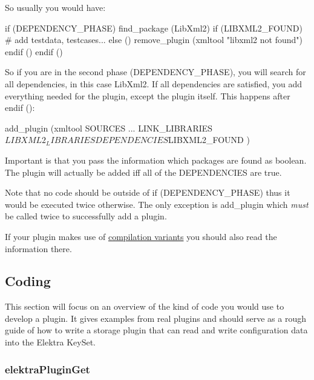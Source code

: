 So usually you would have\+: \begin{DoxyVerb}    if (DEPENDENCY_PHASE)
            find_package (LibXml2)
            if (LIBXML2_FOUND)
                    # add testdata, testcases...
            else ()
                    remove_plugin (xmltool "libxml2 not found")
            endif ()
    endif ()
\end{DoxyVerb}


So if you are in the second phase ({\ttfamily D\+E\+P\+E\+N\+D\+E\+N\+C\+Y\+\_\+\+P\+H\+A\+S\+E}), you will search for all dependencies, in this case {\ttfamily Lib\+Xml2}. If all dependencies are satisfied, you add everything needed for the plugin, except the plugin itself. This happens after {\ttfamily endif ()}\+: \begin{DoxyVerb}    add_plugin (xmltool
            SOURCES
                    ...
            LINK_LIBRARIES
                    ${LIBXML2_LIBRARIES}
            DEPENDENCIES
                    ${LIBXML2_FOUND}
            )
\end{DoxyVerb}


Important is that you pass the information which packages are found as boolean. The plugin will actually be added iff all of the {\ttfamily D\+E\+P\+E\+N\+D\+E\+N\+C\+I\+E\+S} are true.

Note that no code should be outside of {\ttfamily if (D\+E\+P\+E\+N\+D\+E\+N\+C\+Y\+\_\+\+P\+H\+A\+S\+E)} thus it would be executed twice otherwise. The only exception is {\ttfamily add\+\_\+plugin} which {\itshape must} be called twice to successfully add a plugin.

If your plugin makes use of \hyperlink{doc_tutorials_compilation-variants_md}{compilation variants} you should also read the information there.

\subsection*{Coding}

This section will focus on an overview of the kind of code you would use to develop a plugin. It gives examples from real plugins and should serve as a rough guide of how to write a storage plugin that can read and write configuration data into the Elektra Key\+Set.

\subsubsection*{elektra\+Plugin\+Get}

